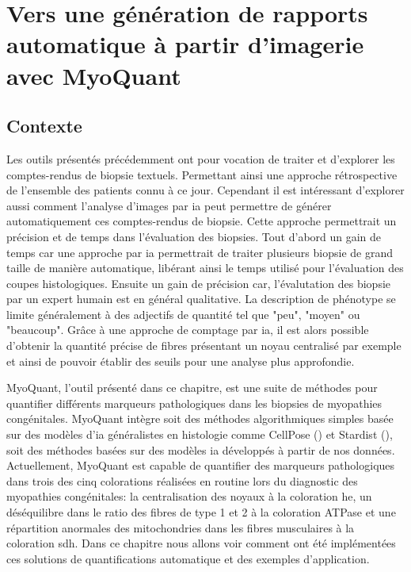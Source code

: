 \chapter{Vers une génération de rapports automatique à partir d’imagerie avec MyoQuant}
\section{Contexte}
Les outils présentés précédemment ont pour vocation de traiter et d'explorer les comptes-rendus de biopsie textuels. Permettant ainsi une approche rétrospective de l'ensemble des patients connu à ce jour. Cependant il est intéressant d'explorer aussi comment l'analyse d'images par \gls{ia} peut permettre de générer automatiquement ces comptes-rendus de biopsie. Cette approche permettrait un précision et de temps dans l'évaluation des biopsies. Tout d'abord un gain de temps car une approche par \gls{ia} permettrait de traiter  plusieurs biopsie de grand taille de manière automatique, libérant ainsi le temps utilisé pour l'évaluation des coupes histologiques.  Ensuite un gain de précision car, l'évalutation des biopsie par un expert humain est en général qualitative. La description de phénotype se limite généralement à des adjectifs de quantité tel que "peu", "moyen" ou "beaucoup". Grâce à une approche de comptage par \gls{ia}, il est alors possible d'obtenir la quantité précise de fibres présentant un noyau centralisé par exemple et ainsi de pouvoir établir des seuils pour une analyse plus approfondie.

MyoQuant, l'outil présenté dans ce chapitre, est une suite de méthodes pour quantifier différents marqueurs pathologiques dans les biopsies de myopathies congénitales. MyoQuant intègre soit des méthodes algorithmiques simples basée sur des modèles d'\gls{ia} généralistes en histologie comme CellPose (\cite{stringer_cellpose_2021}) et Stardist (\cite{weigert_star-convex_2020}), soit des méthodes basées sur des modèles \gls{ia} développés à partir de nos données. Actuellement, MyoQuant est capable de quantifier des marqueurs pathologiques dans trois des cinq colorations réalisées en routine lors du diagnostic des myopathies congénitales: la centralisation des noyaux à la coloration \gls{he}, un déséquilibre dans le ratio des fibres de type 1 et 2 à la coloration ATPase et une répartition anormales des mitochondries dans les fibres musculaires à la coloration \gls{sdh}. Dans ce chapitre nous allons voir comment ont été implémentées ces solutions de quantifications automatique et des exemples d'application.

